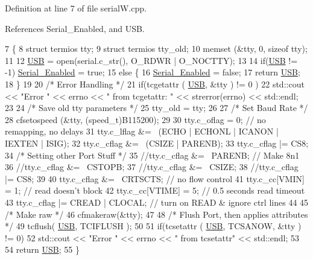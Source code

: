 Definition at line 7 of file serial\+W.\+cpp.



References Serial\+\_\+\+Enabled, and U\+SB.


\begin{DoxyCode}
7                                    \{
8     \textcolor{keyword}{struct }termios tty;
9     \textcolor{keyword}{struct }termios tty\_old;
10     memset (&tty, 0, \textcolor{keyword}{sizeof} tty);
11 
12     \hyperlink{class_serial_w_addbc2cde514329294a30fd04da051ec8}{USB} = open(serial.c\_str(), O\_RDWR | O\_NOCTTY);
13 
14     \textcolor{keywordflow}{if}(\hyperlink{class_serial_w_addbc2cde514329294a30fd04da051ec8}{USB} != -1) \hyperlink{class_serial_w_a557f72152ee772956c44fade26c1fd14}{Serial\_Enabled} = \textcolor{keyword}{true};
15     \textcolor{keywordflow}{else} \{
16         \hyperlink{class_serial_w_a557f72152ee772956c44fade26c1fd14}{Serial\_Enabled} = \textcolor{keyword}{false};
17         \textcolor{keywordflow}{return} \hyperlink{class_serial_w_addbc2cde514329294a30fd04da051ec8}{USB};
18     \}
19 
20     \textcolor{comment}{/* Error Handling */}
21     \textcolor{keywordflow}{if}(tcgetattr ( \hyperlink{class_serial_w_addbc2cde514329294a30fd04da051ec8}{USB}, &tty ) != 0 )
22         std::cout << \textcolor{stringliteral}{"Error "} << errno << \textcolor{stringliteral}{" from tcgetattr: "} << strerror(errno) << std::endl;
23 
24     \textcolor{comment}{/* Save old tty parameters */}
25     tty\_old = tty;
26 
27     \textcolor{comment}{/* Set Baud Rate */}
28     cfsetospeed (&tty, (speed\_t)B115200);
29 
30     tty.c\_oflag = 0;    \textcolor{comment}{// no remapping, no delays}
31     tty.c\_lflag &= ~(ECHO | ECHONL | ICANON | IEXTEN | ISIG);
32     tty.c\_cflag &= ~(CSIZE | PARENB);
33     tty.c\_cflag |= CS8;
34     \textcolor{comment}{/* Setting other Port Stuff */}
35     \textcolor{comment}{//tty.c\_cflag     &=  ~PARENB;            // Make 8n1}
36     \textcolor{comment}{//tty.c\_cflag     &=  ~CSTOPB;}
37     \textcolor{comment}{//tty.c\_cflag     &=  ~CSIZE;}
38     \textcolor{comment}{//tty.c\_cflag     |=  CS8;}
39 
40     tty.c\_cflag     &=  ~CRTSCTS;           \textcolor{comment}{// no flow control}
41     tty.c\_cc[VMIN]   =  1;                  \textcolor{comment}{// read doesn't block}
42     tty.c\_cc[VTIME]  = 5;                  \textcolor{comment}{// 0.5 seconds read timeout}
43     tty.c\_cflag     |=  CREAD | CLOCAL;     \textcolor{comment}{// turn on READ & ignore ctrl lines}
44 
45     \textcolor{comment}{/* Make raw */}
46     cfmakeraw(&tty);
47 
48     \textcolor{comment}{/* Flush Port, then applies attributes */}
49     tcflush( \hyperlink{class_serial_w_addbc2cde514329294a30fd04da051ec8}{USB}, TCIFLUSH );
50 
51     \textcolor{keywordflow}{if}(tcsetattr ( \hyperlink{class_serial_w_addbc2cde514329294a30fd04da051ec8}{USB}, TCSANOW, &tty ) != 0)
52         std::cout << \textcolor{stringliteral}{"Error "} << errno << \textcolor{stringliteral}{" from tcsetattr"} << std::endl;
53 
54     \textcolor{keywordflow}{return} \hyperlink{class_serial_w_addbc2cde514329294a30fd04da051ec8}{USB};
55 \}
\end{DoxyCode}


